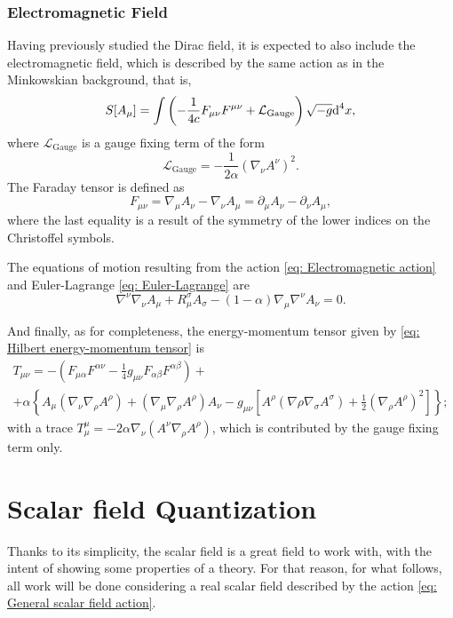 \subsubsection{Electromagnetic Field}
Having previously studied the Dirac field, it is expected to also include the electromagnetic field, which is described by the same action as in the Minkowskian background, that is,
\begin{equation}\label{eq: Electromagnetic action}
	S[A_\mu]=\int\left(-\frac{1}{4 c}F_{\mu\nu}F^{\mu\nu}+\mathcal{L}_{\text{Gauge}}\right)\sqrt{-g}\text{d}^4x,
\end{equation}
where $\mathcal{L}_{\text{Gauge}}$ is a gauge fixing term of the form
\begin{equation}
	\mathcal{L}_{\text{Gauge}}=-\frac{1}{2\alpha}\left(\nabla_\nu A^\nu\right)^2.
\end{equation}
The Faraday tensor is defined as
\begin{equation}
	F_{\mu\nu}=\nabla_\mu A_\nu-\nabla_\nu A_\mu=\partial_\mu A_\nu-\partial_\nu A_\mu,
\end{equation}
where the last equality is a result of the symmetry of the lower indices on the Christoffel symbols.


The equations of motion resulting from the action \ref{eq: Electromagnetic action} and Euler-Lagrange \ref{eq: Euler-Lagrange} are
\begin{equation}
	\nabla^\nu\nabla_\nu A_\mu+R_\mu^\sigma A_\sigma-\left(1-\alpha\right)\nabla_\mu\nabla^\nu A_\nu=0.
\end{equation}

And finally, as for completeness, the energy-momentum tensor \cite[sec.\,3.8]{BirrelDavies} given by \ref{eq: Hilbert energy-momentum tensor} is
\begin{multline}
	T_{\mu\nu}=-\left(F_{\mu\alpha}F^{\alpha\nu}-\frac{1}{4}g_{\mu\nu}F_{\alpha\beta}F^{\alpha\beta}\right)+\\
	+\alpha\left\{A_\mu\left(\nabla_\nu\nabla_\rho A^\rho\right)+\left(\nabla_\mu\nabla_\rho A^\rho\right)A_\nu-g_{\mu\nu}\left[A^\rho\left(\nabla\rho\nabla_\sigma A^\sigma\right)+\frac{1}{2}\left(\nabla_\rho A^\rho\right)^2\right]\right\};
\end{multline}
with a trace $T^\mu_\mu=-2\alpha\nabla_\nu\left(A^\nu \nabla_\rho A^\rho\right)$, which is contributed by the gauge fixing term only.
\section{Scalar field Quantization}
Thanks to its simplicity, the scalar field is a great field to work with, with the intent of showing some properties of a theory. For that reason, for what follows, all work will be done considering a real scalar field described by the action \ref{eq: General scalar field action}.

